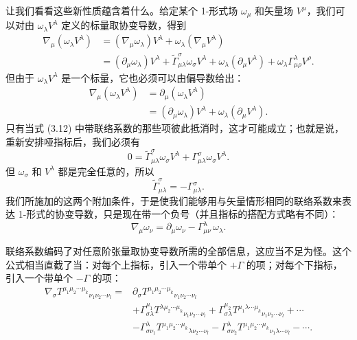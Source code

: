 让我们看看这些新性质蕴含着什么。给定某个 1-形式场 $\omega_\mu$ 和矢量场 $V^\mu$，我们可以对由 $\omega_\lambda V^\lambda$ 定义的标量取协变导数，得到
\begin{align*}
\nabla_\mu(\omega_\lambda V^\lambda) &= (\nabla_\mu\omega_\lambda)V^\lambda + \omega_\lambda(\nabla_\mu V^\lambda)\\
&= (\partial_\mu\omega_\lambda)V^\lambda + \widetilde{\Gamma}^\sigma_{\mu\lambda}\omega_\sigma V^\lambda + \omega_\lambda(\partial_\mu V^\lambda) + \omega_\lambda\Gamma^\lambda_{\mu\rho}V^\rho.
\tag{3.12}
\end{align*}
但由于 $\omega_\lambda V^\lambda$ 是一个标量，它也必须可以由偏导数给出：
\begin{align*}
\nabla_\mu(\omega_\lambda V^\lambda) &= \partial_\mu(\omega_\lambda V^\lambda)\\
&= (\partial_\mu\omega_\lambda)V^\lambda + \omega_\lambda(\partial_\mu V^\lambda).
\tag{3.13}
\end{align*}
只有当式 (3.12) 中带联络系数的那些项彼此抵消时，这才可能成立；也就是说，重新安排哑指标后，我们必须有
\begin{equation*}
0 = \widetilde{\Gamma}^\sigma_{\mu\lambda}\omega_\sigma V^\lambda + \Gamma^\sigma_{\mu\lambda}\omega_\sigma V^\lambda.
\tag{3.14}
\end{equation*}
但 $\omega_\sigma$ 和 $V^\lambda$ 都是完全任意的，所以
\begin{equation*}
\widetilde{\Gamma}^\sigma_{\mu\lambda} = -\Gamma^\sigma_{\mu\lambda}.
\tag{3.15}
\end{equation*}
我们所施加的这两个附加条件，于是使我们能够用与矢量情形相同的联络系数来表达 1-形式的协变导数，只是现在带一个负号（并且指标的搭配方式略有不同）：
\begin{equation*}
\boxed{\;\nabla_\mu\omega_\nu = \partial_\mu\omega_\nu - \Gamma^\lambda_{\mu\nu}\,\omega_\lambda.\;}
\tag{3.16}
\end{equation*}

联络系数编码了对任意阶张量取协变导数所需的全部信息，这应当不足为怪。这个公式相当直截了当：对每个上指标，引入一个带单个 $+\Gamma$ 的项；对每个下指标，引入一个带单个 $-\Gamma$ 的项：
\begin{align*}
\nabla_\sigma T^{\mu_1\mu_2\cdots\mu_k}{}_{\nu_1\nu_2\cdots\nu_l} ={}& \partial_\sigma T^{\mu_1\mu_2\cdots\mu_k}{}_{\nu_1\nu_2\cdots\nu_l}\\
&+ \Gamma^{\mu_1}_{\sigma\lambda}T^{\lambda\mu_2\cdots\mu_k}{}_{\nu_1\nu_2\cdots\nu_l} + \Gamma^{\mu_2}_{\sigma\lambda}T^{\mu_1\lambda\cdots\mu_k}{}_{\nu_1\nu_2\cdots\nu_l} + \cdots\\
&- \Gamma^{\lambda}_{\sigma\nu_1}T^{\mu_1\mu_2\cdots\mu_k}{}_{\lambda\nu_2\cdots\nu_l} - \Gamma^{\lambda}_{\sigma\nu_2}T^{\mu_1\mu_2\cdots\mu_k}{}_{\nu_1\lambda\cdots\nu_l} - \cdots.
\tag{3.17}
\end{align*}

